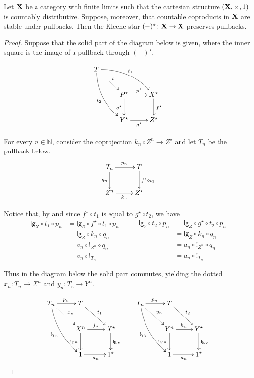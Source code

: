 \documentclass[runningheads,envcountsect]{llncs}
\newcommand{\lgh}{\mathsf{lg}}
\def\X{\textbf {\textup{X}}}
\begin{document}
\begin{proposition}
	Let $\X$ be a category with finite limits such that the cartesian structure $(\X, \times, 1)$ is countably distributive. Suppose, moreover, that countable  coproducts in $\X$ are stable under pullbacks. Then the Kleene star $(-)^\star \colon \X\to \X$ preserves pullbacks.
\end{proposition}
\begin{proof}
 Suppose that the solid part of the diagram below is given, where  the inner square is the image of a pullback through $(-)^\star$.
 
 \[\xymatrix{T \ar@/^.4cm/[drr]^{t_1} \ar@/_.4cm/[ddr]_{t_2} \ar@{.>}[dr]^t\\ & P^\star  \ar[d]_{q^\star}\ar[r]^{p^\star}& X^\star \ar[d]^{f^\star} \\ & Y^\star\ar[r]_{g^\star} & Z^\star}\]
	
	
	For every $n\in \mathbb{N}$, consider the coprojection $k_n\circ Z^n\to Z^\star$ and let $T_n$ be the pullback below.
	\[\xymatrix{T_n \ar[r]^{p_n} \ar[d]_{q_n} & T  \ar[d]^{f^\star \circ t_1}\\
	Z^n \ar[r]_{k_n}& Z^\star}\]
	
	Notice that, by  and since $f^\star \circ t_1$ is equal to $g^\star \circ t_2$, we have
	\[
	\begin{split}
		\lgh_X\circ t_1 \circ p_n&=\lgh_Z\circ f^\star \circ t_1\circ p_n\\&=\lgh_Z\circ k_n\circ q_n\\&=a_n\circ !_{Z^n}\circ q_n\\&=a_n\circ !_{T_n}
	\end{split}\qquad \begin{split}
		\lgh_Y\circ t_2 \circ p_n&=\lgh_Z\circ g^\star \circ t_2\circ p_n\\&=\lgh_Z\circ k_n\circ q_n\\&=a_n\circ !_{Z^n}\circ q_n\\&=a_n\circ !_{T_n}
	\end{split}\]
	
	Thus in the diagram below the solid part commutes, yielding the dotted $x_n\colon T_n\to X^n$ and $y_n\colon T_n\to Y^n$.
	
	\[\xymatrix{T_n  \ar@/_.3cm/[ddr]_{!_{T_n}}\ar@{.>}[dr]^{x_n} \ar[r]^{p_n} & T \ar[dr]^{t_1}&& T_n \ar@/_.3cm/[ddr]_{!_{T_n}} \ar[r]^{p_n} \ar@{.>}[dr]^{y_n}& T \ar[dr]^{t_2}\\ &X^n   \ar[d]_{!_{X^n}}\ar[r]^{j_n}& X^\star \ar[d]^{\lgh_X}& & Y^n \ar[d]_{!_{Y^n}}  \ar[r]^{h_n}& Y^\star \ar[d]^{\lgh_Y}\\ & 1 \ar[r]_{a_n}& 1^\star && 1  \ar[r]_{a_n}& 1^\star}\]
	

\end{proof}
\end{document}
